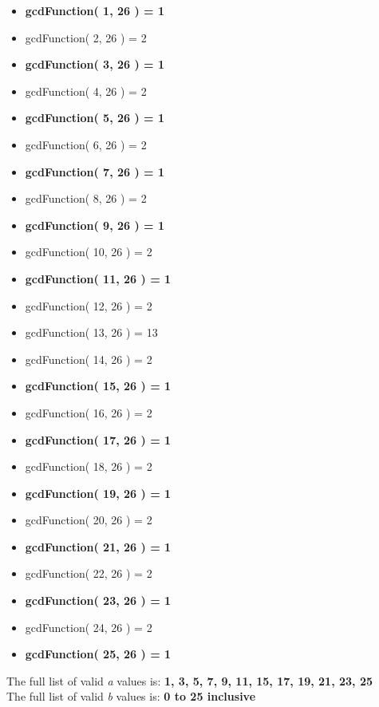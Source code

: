 \documentclass[]{article}
\begin{document}
\begin{multicols}{2}
	\begin{itemize}
		\item \textbf{gcdFunction( 1, 26 ) = 1}
		\item gcdFunction( 2, 26 ) = 2
		\item \textbf{gcdFunction( 3, 26 ) = 1}
		\item gcdFunction( 4, 26 ) = 2
		\item \textbf{gcdFunction( 5, 26 ) = 1}
		\item gcdFunction( 6, 26 ) = 2
		\item \textbf{gcdFunction( 7, 26 ) = 1}
		\item gcdFunction( 8, 26 ) = 2
	    \item \textbf{gcdFunction( 9, 26 ) = 1}
		\item gcdFunction( 10, 26 ) = 2
		\item \textbf{gcdFunction( 11, 26 ) = 1}
		\item gcdFunction( 12, 26 ) = 2
		\item gcdFunction( 13, 26 ) = 13
		\item gcdFunction( 14, 26 ) = 2
		\item \textbf{gcdFunction( 15, 26 ) = 1}
		\item gcdFunction( 16, 26 ) = 2
		\item \textbf{gcdFunction( 17, 26 ) = 1}
		\item gcdFunction( 18, 26 ) = 2
		\item \textbf{gcdFunction( 19, 26 ) = 1}
		\item gcdFunction( 20, 26 ) = 2
		\item \textbf{gcdFunction( 21, 26 ) = 1}
		\item gcdFunction( 22, 26 ) = 2	
		\item \textbf{gcdFunction( 23, 26 ) = 1}
		\item gcdFunction( 24, 26 ) = 2
		\item \textbf{gcdFunction( 25, 26 ) = 1}
	\end{itemize}
\end{multicols}


\vspace{0.5cm}

The full list of valid \textit{a} values is: \textbf{1, 3, 5, 7, 9, 11, 15, 17, 19, 21, 23, 25}\\

The full list of valid \textit{b} values is: \textbf{0 to 25 inclusive}\\
\end{document}
